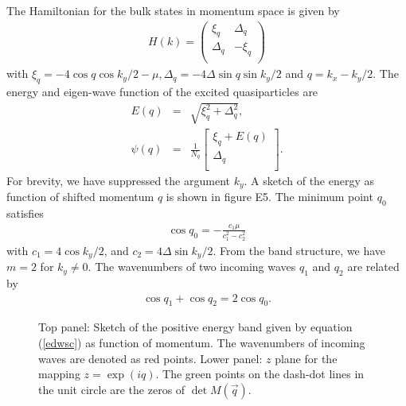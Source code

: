 \documentclass[aps,pra,amsmath,twocolumn,showpacs,bibnotes,10pt]{revtex4-1}
\begin{document}
The Hamiltonian for the bulk states in momentum space is given by
\begin{eqnarray}
H(k) =\begin{pmatrix}
	\xi_q&\Delta_q\\
	\Delta_q&-\xi_q\\
\end{pmatrix}\nonumber
\end{eqnarray}
with $\xi_q=-4\cos q\cos k_y/2-\mu, \Delta_q = -4\Delta\sin q\sin k_y/2$ and $q= k_x-k_y/2$. The energy and eigen-wave function of the excited quasiparticles are  
\begin{eqnarray}
E(q) &=&\sqrt{\xi^2_q+\Delta^2_q},   \label{edwsc}\\
\psi(q)&=&\frac{1}{N_q} \begin{bmatrix}
	\xi_q+E(q)\\
	\Delta_q\\
\end{bmatrix}. \nonumber
\end{eqnarray}
For brevity, we have suppressed the argument $k_y$. A sketch of the energy as function of shifted momentum $q$ is shown in figure E5. The minimum point $q_0$ satisfies
\begin{eqnarray}
\cos q_0 = -\frac{c_1\mu}{c_1^2-c_2^2} \label{cdq0}
\end{eqnarray}
with $c_1=4\cos k_y/2$, and $c_2= 4\Delta\sin k_y/2$. From the band structure, we have $m = 2$ for $k_y\ne 0$. The wavenumbers of two incoming waves $q_1$ and $q_2$ are related by
\begin{eqnarray}
\cos q_1 +\cos q_2= 2\cos q_0. \nonumber
\end{eqnarray}

\begin{figure}[t]
\centerline{}
\caption{Top panel: Sketch of the positive energy band given by equation (\ref{edwsc}) as function of momentum. The wavenumbers of incoming waves are denoted as red points. Lower panel: $z$ plane for the mapping $z = \exp(iq)$. The green points on the dash-dot lines in the unit circle are the zeros of $\det M(\vec q)$.} 
\end{figure} 
\end{document}
